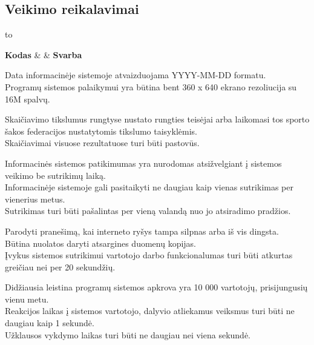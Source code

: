 \documentclass{VUMIFPSkursinis}
\begin{document}
\subsection*{Veikimo reikalavimai}
  \begin{longtabu} to 
    \caption{Veikimo reikalavimai}
    \label{table:veikimoReikalavimai}
    \endfirsthead
    \endhead
    \hline
    \textbf{Kodas} &  & \textbf{Svarba} \\
    \hline
	
    {
      Data informacinėje sistemoje atvaizduojama YYYY-MM-DD formatu. \\
      Programų sistemos palaikymui yra būtina bent 360 x 640 ekrano rezoliucija su 16M spalvų. \\
    }
    
    {
      Skaičiavimo tikslumus rungtyse nustato rungties teisėjai arba laikomasi tos sporto šakos federacijos nustatytomis tikslumo taisyklėmis. \\
      Skaičiavimai visuose rezultatuose turi būti pastovūs.
    }
    
    {
      Informacinės sistemos patikimumas yra nurodomas atsižvelgiant į sistemos veikimo be sutrikimų laiką. \\
      Informacinėje sistemoje gali pasitaikyti ne daugiau kaip vienas sutrikimas per vienerius metus. \\
      Sutrikimas turi būti pašalintas per vieną valandą nuo jo atsiradimo pradžios.
    }
    
    {
      Parodyti pranešimą, kai interneto ryšys tampa silpnas arba iš vis dingsta. \\
      Būtina nuolatos daryti atsargines duomenų kopijas. \\
      Įvykus sistemos sutrikimui vartotojo darbo funkcionalumas turi būti atkurtas greičiau nei per 20 sekundžių.
    }
    
    {
      Didžiausia leistina programų sistemos apkrova yra 10 000 vartotojų, prisijungusių vienu metu. \\
      Reakcijos laikas į sistemos vartotojo, dalyvio atliekamus veiksmus turi būti ne daugiau kaip 1 sekundė. \\
      Užklausos vykdymo laikas turi būti ne daugiau nei viena sekundė.
    }
	\end{longtabu}
	
\end{document}
